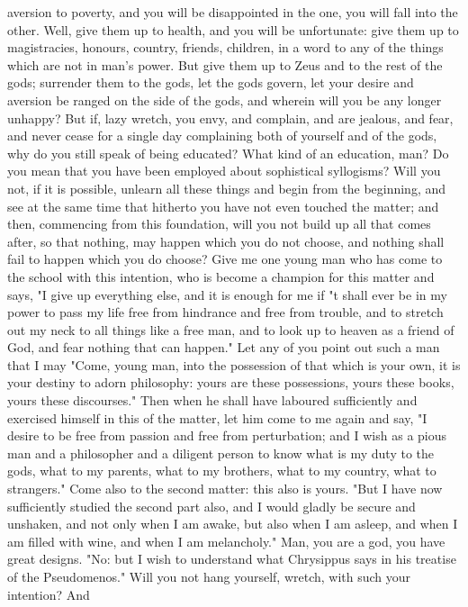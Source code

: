 \documentclass[a4paper]{article}
\begin{document}
aversion to poverty, and you will be disappointed in the one, you will fall
into the other. Well, give them up to health, and you will be unfortunate: give
them up to magistracies, honours, country, friends, children, in a word to any
of the things which are not in man's power. But give them up to Zeus and to the
rest of the gods; surrender them to the gods, let the gods govern, let your
desire and aversion be ranged on the side of the gods, and wherein will you be
any longer unhappy? But if, lazy wretch, you envy, and complain, and are
jealous, and fear, and never cease for a single day complaining both of
yourself and of the gods, why do you still speak of being educated? What kind
of an education, man? Do you mean that you have been employed about sophistical
syllogisms? Will you not, if it is possible, unlearn all these things and begin
from the beginning, and see at the same time that hitherto you have not even
touched the matter; and then, commencing from this foundation, will you not
build up all that comes after, so that nothing, may happen which you do not
choose, and nothing shall fail to happen which you do choose?
    Give me one young man who has come to the school with this intention, who
is become a champion for this matter and says, "I give up everything else, and
it is enough for me if "t shall ever be in my power to pass my life free from
hindrance and free from trouble, and to stretch out my neck to all things like
a free man, and to look up to heaven as a friend of God, and fear nothing that
can happen." Let any of you point out such a man that I may "Come, young man,
into the possession of that which is your own, it is your destiny to adorn
philosophy: yours are these possessions, yours these books, yours these
discourses." Then when he shall have laboured sufficiently and exercised
himself in this of the matter, let him come to me again and say, "I desire to
be free from passion and free from perturbation; and I wish as a pious man and
a philosopher and a diligent person to know what is my duty to the gods, what
to my parents, what to my brothers, what to my country, what to strangers."
Come also to the second matter: this also is yours. "But I have now
sufficiently studied the second part also, and I would gladly be secure and
unshaken, and not only when I am awake, but also when I am asleep, and when I
am filled with wine, and when I am melancholy." Man, you are a god, you have
great designs.
    "No: but I wish to understand what Chrysippus says in his treatise of the
Pseudomenos." Will you not hang yourself, wretch, with such your intention? And
\end{document}
